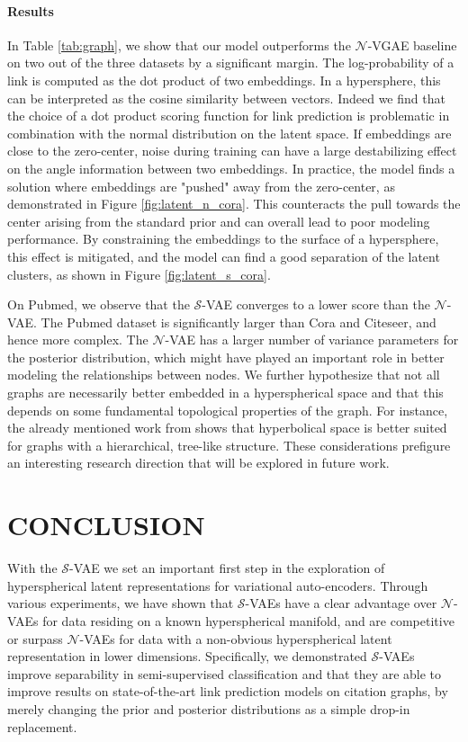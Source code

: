 \documentclass[letterpaper]{article}
\newcommand{\Sv}{$\mathcal{S}$}
\newcommand{\Nv}{$\mathcal{N}$}
\begin{document}
\paragraph{Results} In Table \ref{tab:graph}, we show that our model outperforms the \Nv-VGAE baseline on two out of the three datasets by a significant margin. The log-probability of a link is computed as the dot product of two embeddings. In a hypersphere, this can be interpreted as the cosine similarity between vectors. Indeed we find that the choice of a dot product scoring function for link prediction is problematic in combination with the normal distribution on the latent space. If embeddings are close to the zero-center, noise during training can have a large destabilizing effect on the angle information between two embeddings. In practice, the model finds a solution where embeddings are "pushed" away from the zero-center, as demonstrated in Figure \ref{fig:latent_n_cora}. This counteracts the pull towards the center arising from the standard prior and can overall lead to poor modeling performance. By constraining the embeddings to the surface of a hypersphere, this effect is mitigated, and the model can find a good separation of the latent clusters, as shown in Figure \ref{fig:latent_s_cora}. 

On Pubmed, we observe that the \Sv-VAE converges to a lower score than the \Nv-VAE. The Pubmed dataset is significantly larger than Cora and Citeseer, and hence more complex. The \Nv-VAE has a larger number of variance parameters for the posterior distribution, which might have played an important role in better modeling the relationships between nodes. We further hypothesize that not all graphs are necessarily better embedded in a hyperspherical space and that this depends on some fundamental topological properties of the graph. For instance, the already mentioned work from \citet{nickel2017poincare} shows that hyperbolical space is better suited for graphs with a hierarchical, tree-like structure. These considerations prefigure an interesting research direction that will be explored in future work. 


\section{CONCLUSION}

With the \Sv-VAE we set an important first step in the exploration of hyperspherical latent representations for variational auto-encoders. Through various experiments, we have shown that \Sv-VAEs have a clear advantage over \Nv-VAEs for data residing on a known hyperspherical manifold, and are competitive or surpass \Nv-VAEs for data with a non-obvious hyperspherical latent representation in lower dimensions. Specifically, we demonstrated \Sv-VAEs improve separability in semi-supervised classification and that they are able to improve results on state-of-the-art link prediction models on citation graphs, by merely changing the prior and posterior distributions as a simple drop-in replacement.
\end{document}
